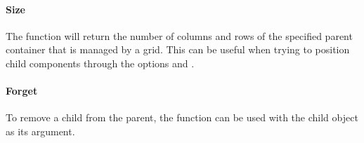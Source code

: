 \paragraph{Size}
The function  will return the number of columns
and rows of the specified parent container that is managed by a
grid. This can be useful when trying to position child components
through the options  and .

\paragraph{Forget}
To remove a child from the parent, the 
function can be used with the child object as its argument.




